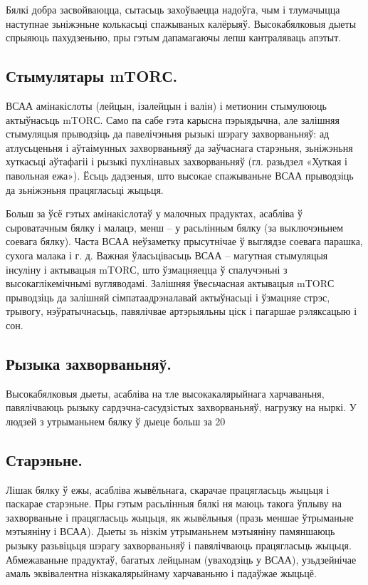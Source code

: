 Бялкі добра засвойваюцца, сытасьць захоўваецца надоўга, чым і тлумачыцца наступнае зьніжэньне колькасьці спажываных калёрыяў. Высокабялковыя дыеты спрыяюць пахудзеньню, пры гэтым дапамагаючы лепш кантраляваць апэтыт.

\subsection{Стымулятары mTORС.}
ВСАА амінакіслоты (лейцын, ізалейцын і валін) і метионин стымулююць актыўнасьць mTORС. Само па сабе гэта карысна пэрыядычна, але залішняя стымуляцыя прыводзіць да павелічэньня рызыкі шэрагу захворваньняў: ад атлусьценьня і аўтаімунных захворваньняў да заўчаснага старэньня, зьніжэньня хуткасьці аўтафагіі і рызыкі пухлінавых захворваньняў (гл. разьдзел «Хуткая і павольная ежа»). Ёсьць дадзеныя, што высокае спажываньне ВСАА прыводзіць да зьніжэньня працягласьці жыцьця.

Больш за ўсё гэтых амінакіслотаў у малочных прадуктах, асабліва ў сыроватачным бялку і малацэ, менш – у расьлінным бялку (за выключэньнем соевага бялку). Часта ВСАА неўзаметку прысутнічае ў выглядзе соевага парашка, сухога малака і г. д. Важная ўласьцівасьць ВСАА – магутная стымуляцыя інсуліну і актывацыя mTORС, што ўзмацняецца ў спалучэньні з высокаглікемічнымі вугляводамі. Залішняя ўвесьчасная актывацыя mTORС прыводзіць да залішняй сімпатаадрэналавай актыўнасьці і ўзмацняе стрэс, трывогу, нэўратычнасьць, павялічвае артэрыяльны ціск і пагаршае рэляксацыю і сон.

\subsection{Рызыка захворваньняў.}
Высокабялковыя дыеты, асабліва на тле высокакалярыйнага харчаваньня, павялічваюць рызыку сардэчна-сасудзістых захворваньняў, нагрузку на ныркі. У людзей з утрыманьнем бялку ў дыеце больш за 20%

\subsection{Старэньне.}
Лішак бялку ў ежы, асабліва жывёльнага, скарачае працягласьць жыцьця і паскарае старэньне. Пры гэтым расьлінныя бялкі ня маюць такога ўплыву на захворваньне і працягласьць жыцьця, як жывёльныя (празь меншае ўтрыманьне мэтыяніну і ВСАА). Дыеты зь нізкім утрыманьнем мэтыяніну памяншаюць рызыку разьвіцьця шэрагу захворваньняў і павялічваюць працягласьць жыцьця. Абмежаваньне прадуктаў, багатых лейцынам (уваходзіць у ВСАА), узьдзейнічае амаль эквівалентна нізкакалярыйнаму харчаваньню і падаўжае жыцьцё.

